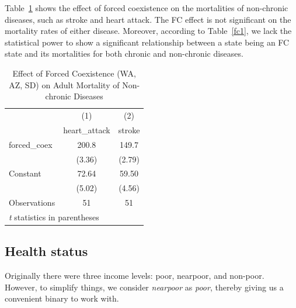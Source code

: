 \documentclass[12pt]{article}
\begin{document}
Table~\ref{fc2} shows the effect of forced coexistence on the mortalities of non-chronic diseases, such as stroke and heart attack. The FC effect is not significant on the mortality rates of either disease.
Moreover, according to Table~\ref{fc1}, we lack the statistical power to show a significant relationship between a state being an FC state and its mortalities for both chronic and non-chronic diseases.

\begin{table}[htbp]\centering \caption{Effect of Forced Coexistence (WA, AZ, SD) on Adult Mortality of Non-chronic Diseases\label{fc2}} \begin{tabular}{l*{2}{c}} \toprule
                    &\multicolumn{1}{c}{(1)}&\multicolumn{1}{c}{(2)}\\
                    &\multicolumn{1}{c}{heart\_attack}&\multicolumn{1}{c}{stroke}\\
\midrule
forced\_coex         &       200.8&       149.7\\
                    &      (3.36)&      (2.79)\\
\addlinespace
Constant            &       72.64&       59.50\\
                    &      (5.02)&      (4.56)\\
\midrule
Observations        &          51&          51\\
\bottomrule
\multicolumn{3}{l}{\footnotesize \textit{t} statistics in parentheses}\\
\end{tabular}
\end{table}






\subsection{Health status}
Originally there were three income levels: poor, nearpoor, and non-poor.
However, to simplify things, we consider \emph{nearpoor} as \emph{poor}, thereby giving us a convenient binary to work with.
\end{document}
